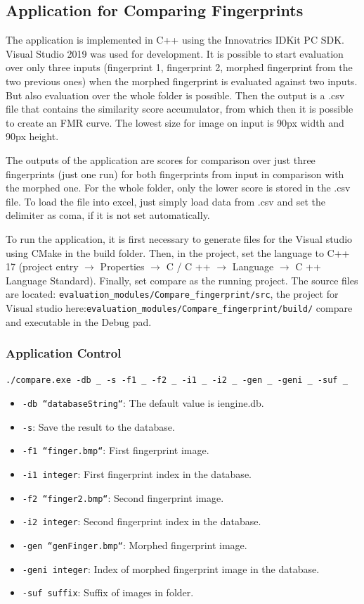 \subsection{Application for Comparing Fingerprints} 
\label{fca}
The application is implemented in C++ using the Innovatrics IDKit PC SDK. Visual Studio 2019 was used for development. It is possible to start evaluation over only three inputs (fingerprint 1, fingerprint 2, morphed fingerprint from the two previous ones) when the morphed fingerprint is evaluated against two inputs. But also evaluation over the whole folder is possible. Then the output is a .csv file that contains the similarity score accumulator, from which then it is possible to create an FMR curve. The lowest size for image on input is 90px width and 90px height.

The outputs of the application are scores for comparison over just three fingerprints (just one run) for both fingerprints from input in comparison with the morphed one. For the whole folder, only the lower score is stored in the .csv file. To load the file into excel, just simply load data from .csv and set the  delimiter as coma, if it is not set automatically.

To run the application, it is first necessary to generate files for the Visual studio using CMake in the build folder. Then, in the project, set the language to C++ 17 (project entry $ \rightarrow $ Properties $ \rightarrow $ C / C ++ $ \rightarrow $ Language $ \rightarrow $ C ++ Language Standard). Finally, set compare as the running project. The source files are located: \texttt{evaluation\_modules/Compare\_finge\-rprint/src}, the project for Visual studio here:\texttt{evaluation\_modules/Compare\_fingerpri\-nt/build/} compare and executable in the Debug pad.

\subsubsection{Application Control}
\texttt{./compare.exe -db \_ -s -f1 \_ -f2 \_ -i1 \_ -i2 \_ -gen \_ -geni \_ -suf \_}
\begin{itemize}
    \item \texttt{-db ``databaseString``}: The default value is iengine.db.
    \item \texttt{-s}: Save the result to the database.
    \item \texttt{-f1 ``finger.bmp``}: First fingerprint image.
    \item \texttt{-i1 integer}: First fingerprint index in the database.
    \item \texttt{-f2 ``finger2.bmp``}: Second fingerprint image.
    \item \texttt{-i2 integer}: Second fingerprint index in the database.
    \item \texttt{-gen ``genFinger.bmp``}: Morphed fingerprint image.
    \item \texttt{-geni integer}: Index of morphed fingerprint image in the database.
    \item \texttt{-suf suffix}: Suffix of images in folder.
\end{itemize}

